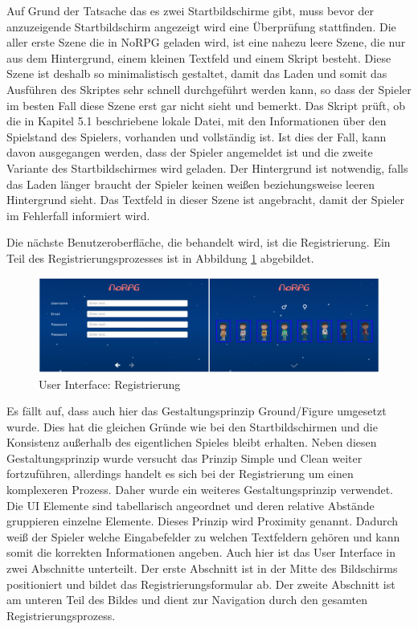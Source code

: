 			Auf Grund der Tatsache das es zwei Startbildschirme gibt, muss bevor der anzuzeigende Startbildschirm angezeigt wird eine Überprüfung stattfinden. Die aller erste Szene die in NoRPG geladen wird, ist eine nahezu leere Szene, die nur aus dem Hintergrund, einem kleinen Textfeld und einem Skript besteht. Diese Szene ist deshalb so minimalistisch gestaltet, damit das Laden und somit das Ausführen des Skriptes sehr schnell durchgeführt werden kann, so dass der Spieler im besten Fall diese Szene erst gar nicht sieht und bemerkt. Das Skript prüft, ob die in Kapitel 5.1 beschriebene lokale Datei, mit den Informationen über den Spielstand des Spielers, vorhanden und vollständig ist. Ist dies der Fall, kann davon ausgegangen werden, dass der Spieler angemeldet ist und die zweite Variante des Startbildschirmes wird geladen. Der Hintergrund ist notwendig, falls das Laden länger braucht der Spieler keinen weißen beziehungsweise leeren Hintergrund sieht. Das Textfeld in dieser Szene ist angebracht, damit der Spieler im Fehlerfall informiert wird.
			
			Die nächste Benutzeroberfläche, die behandelt wird, ist die Registrierung. Ein Teil des Registrierungsprozesses ist in Abbildung \ref{registerUI} abgebildet.
			
			\begin{figure}[htbp]
				\centering 
				\label{registerUI}
				\includegraphics[width=\textwidth]{pics/registerScreen.png}
				\caption{User Interface: Registrierung}
			\end{figure}
		
			Es fällt auf, dass auch hier das Gestaltungsprinzip Ground/Figure umgesetzt wurde. Dies hat die gleichen Gründe wie bei den Startbildschirmen und die Konsistenz außerhalb des eigentlichen Spieles bleibt erhalten. Neben diesen Gestaltungsprinzip wurde versucht das Prinzip Simple und Clean weiter fortzuführen, allerdings handelt es sich bei der Registrierung um einen komplexeren Prozess. Daher wurde ein weiteres Gestaltungsprinzip verwendet. Die UI Elemente sind tabellarisch angeordnet und deren relative Abstände gruppieren einzelne Elemente. Dieses Prinzip wird Proximity genannt. Dadurch weiß der Spieler welche Eingabefelder zu welchen Textfeldern gehören und kann somit die korrekten Informationen angeben. Auch hier ist das User Interface in zwei Abschnitte unterteilt. Der erste Abschnitt ist in der Mitte des Bildschirms positioniert und bildet das Registrierungsformular ab. Der zweite Abschnitt ist am unteren Teil des Bildes und dient zur Navigation durch den gesamten Registrierungsprozess.
			
